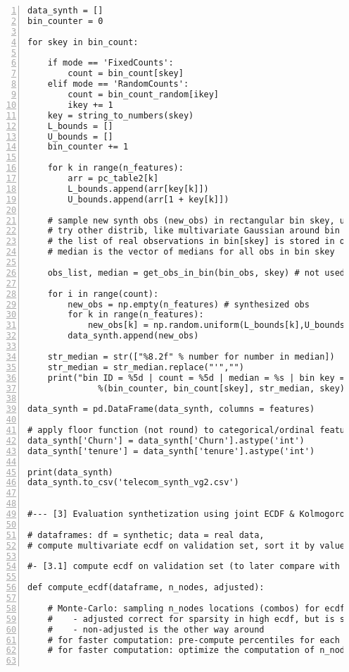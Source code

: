 \documentclass[oneside,10pt]{book}
\begin{document}
\begin{lstlisting}[numbers=left]
data_synth = []
bin_counter = 0

for skey in bin_count:

    if mode == 'FixedCounts':
        count = bin_count[skey]
    elif mode == 'RandomCounts': 
        count = bin_count_random[ikey]
        ikey += 1
    key = string_to_numbers(skey)
    L_bounds = []
    U_bounds = []
    bin_counter += 1

    for k in range(n_features):
        arr = pc_table2[k] 
        L_bounds.append(arr[key[k]])
        U_bounds.append(arr[1 + key[k]])

    # sample new synth obs (new_obs) in rectangular bin skey, uniformily
    # try other distrib, like multivariate Gaussian around bin median 
    # the list of real observations in bin[skey] is stored in obs_list (numpy array)
    # median is the vector of medians for all obs in bin skey

    obs_list, median = get_obs_in_bin(bin_obs, skey) # not used in this version
    
    for i in range(count):        
        new_obs = np.empty(n_features) # synthesized obs
        for k in range(n_features):
            new_obs[k] = np.random.uniform(L_bounds[k],U_bounds[k])
        data_synth.append(new_obs)

    str_median = str(["%8.2f" % number for number in median])
    str_median = str_median.replace("'","")
    print("bin ID = %5d | count = %5d | median = %s | bin key = %s" 
              %(bin_counter, bin_count[skey], str_median, skey))

data_synth = pd.DataFrame(data_synth, columns = features)

# apply floor function (not round) to categorical/ordinal features
data_synth['Churn'] = data_synth['Churn'].astype('int') 
data_synth['tenure'] = data_synth['tenure'].astype('int')

print(data_synth)    
data_synth.to_csv('telecom_synth_vg2.csv')


#--- [3] Evaluation synthetization using joint ECDF & Kolmogorov-Smirnov distance

# dataframes: df = synthetic; data = real data,
# compute multivariate ecdf on validation set, sort it by value (from 0 to 1) 

#- [3.1] compute ecdf on validation set (to later compare with that on synth data)

def compute_ecdf(dataframe, n_nodes, adjusted):

    # Monte-Carlo: sampling n_nodes locations (combos) for ecdf
    #    - adjusted correct for sparsity in high ecdf, but is sparse in low ecdf  
    #    - non-adjusted is the other way around
    # for faster computation: pre-compute percentiles for each feature
    # for faster computation: optimize the computation of n_nodes SQL-like queries


\end{lstlisting}
\end{document}
